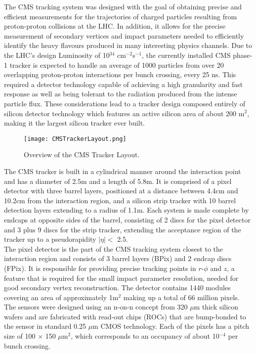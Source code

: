 The CMS tracking system was designed with the goal of obtaining precise and efficient measurements for the trajectories of charged particles resulting from proton-proton collisions at the LHC. 
In addition, it allows for the precise measurement of secondary vertices and impact parameters needed to efficiently identify the heavy flavours produced in many interesting physics channels. Due to the LHC's design Luminosity of 10$^{34}$ cm$^{-2}$s$^{-1}$, the currently installed CMS phase-1 tracker is expected to handle an average of 1000 particles from over 20 overlapping proton-proton interactions per bunch crossing, every 25 ns. This required a detector technology capable of achieving a high granularity and fast response as well as being tolerant to the radiation produced from the intense particle flux. These considerations lead to a tracker design composed entirely of silicon detector technology which features an active silicon area of about 200 m$^2$, making it the largest silicon tracker ever built\cite{CMSdet1}.\\

\begin{figure}[tb]
\begin{center}
\texttt{[image: CMSTrackerLayout.png]} 
\caption{Overview of the CMS Tracker Layout\cite{CMSdet2}.}
\label{CMSTrackerLayout} 
\hspace{4em}
\end{center}
\end{figure}

The CMS tracker is built in a cylindrical manner around the interaction point and has a diameter of 2.5m and a length of 5.8m. It is comprised of a pixel detector with three barrel layers, positioned at a distance between 4.4cm and 10.2cm from the interaction region, and a silicon strip tracker with 10 barrel detection layers extending to a radius of 1.1m. Each system is made complete by endcaps at opposite sides of the barrel, consisting of 2 discs for the pixel detector and 3 plus 9 discs for the strip tracker, extending the acceptance region of the tracker up to a pseudorapidity $|\eta| <$ 2.5.\\

The pixel detector is the part of the CMS tracking system closest to the interaction region and consists of 3 barrel layers (BPix) and 2 endcap discs (FPix). It is responsible for providing precise tracking points in $r$-$\phi$ and $z$, a feature that is required for the small impact parameter resolution, needed for good secondary vertex reconstruction. The detector contains 1440 modules covering an area of approximately 1m$^2$ making up a total of 66 million pixels. The sensors were designed using an n-on-n concept from 320 $\mu$m thick silicon wafers and are fabricated with read-out chips (ROCs) that are bump-bonded to the sensor in standard 0.25 $\mu$m CMOS technology. Each of the pixels has a pitch size of 100 $\times$ 150 $\mu$m$^2$, which corresponds to an occupancy of about 10$^{-4}$ per bunch crossing.\\

